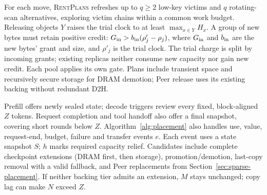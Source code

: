 For each move, \textsc{RentPlans} refreshes up to $q\ge2$ low-key victims
and $q$ rotating-scan alternatives, exploring victim chains within a common
work budget. Releasing objects $Y$ raises the trial clock to at least
$\max_{x\in Y}H_x$. A group of new bytes must retain positive credit:
$G_{\rm in}>b_{\rm in}(\rho'_j-\rho_j)$, where $G_{\rm in}$ and
$b_{\rm in}$ are the new bytes' grant and size, and $\rho'_j$ is the trial
clock. The trial charge is split by incoming grants; existing replicas neither consume new capacity nor gain
new credit. Each pool applies its own gate. Plans include transient space
and recursively secure storage for DRAM demotion; Peer release uses its
existing backing without redundant D2H.

Prefill offers newly sealed state; decode triggers review every fixed,
block-aligned $Z$ tokens. Request completion and tool handoff also offer
a final snapshot, covering short rounds below $Z$.
Algorithm~\ref{alg:placement} also handles use,
value, request-end, budget, failure and transfer events $e$.
Each event uses a state snapshot $S$; $h$ marks required capacity relief.
Candidates include complete checkpoint extensions (DRAM first, then
storage), promotion/demotion, last-copy removal with a valid fallback,
and Peer replacements from Section~\ref{sec:sparse-placement}.
If neither backing tier admits an extension, $M$ stays unchanged;
copy lag can make $N$ exceed $Z$.

